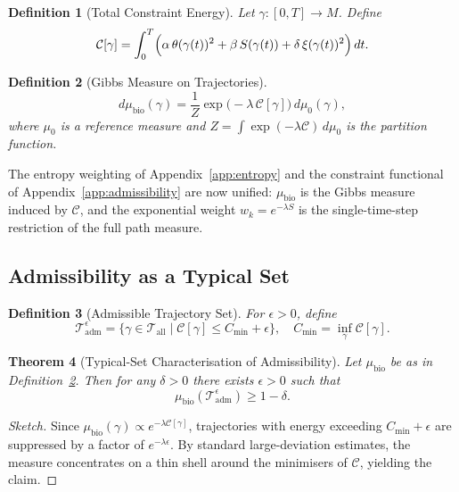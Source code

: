 \documentclass[12pt, a4paper]{article}
\newtheorem{theorem}{Theorem}[section]
\newtheorem{definition}[theorem]{Definition}
\theoremstyle{remark}
\theoremstyle{definition}
\begin{document}
\begin{definition}[Total Constraint Energy]
Let $\gamma\colon[0,T]\to M$.  Define
\[
\mathcal{C}[\gamma]
= \int_0^T \Bigl(
\alpha\,\theta(\gamma(t))^2
+ \beta\,S(\gamma(t))
+ \delta\,\xi(\gamma(t))^2
\Bigr)\,dt.
\]
\end{definition}

\begin{definition}[Gibbs Measure on Trajectories]
\label{def:gibbs}
\[
d\mu_{\mathrm{bio}}(\gamma)
= \frac{1}{Z}\exp\!\bigl(-\lambda\,\mathcal{C}[\gamma]\bigr)\,d\mu_0(\gamma),
\]
where $\mu_0$ is a reference measure and $Z = \int \exp(-\lambda\mathcal{C})\,d\mu_0$
is the partition function.
\end{definition}

The entropy weighting of Appendix~\ref{app:entropy} and the constraint functional of
Appendix~\ref{app:admissibility} are now unified: $\mu_{\mathrm{bio}}$ is the Gibbs
measure induced by $\mathcal{C}$, and the exponential weight $w_k = e^{-\lambda S}$ is
the single-time-step restriction of the full path measure.

\subsection{Admissibility as a Typical Set}

\begin{definition}[Admissible Trajectory Set]
For $\epsilon > 0$, define
\[
\mathcal{T}_{\mathrm{adm}}^\epsilon
= \bigl\{\gamma \in \mathcal{T}_{\mathrm{all}} \mid
\mathcal{C}[\gamma] \le C_{\min} + \epsilon\bigr\},
\quad C_{\min} = \inf_\gamma \mathcal{C}[\gamma].
\]
\end{definition}

\begin{theorem}[Typical-Set Characterisation of Admissibility]
\label{thm:typical}
Let $\mu_{\mathrm{bio}}$ be as in Definition~\ref{def:gibbs}.  Then for any $\delta > 0$
there exists $\epsilon > 0$ such that
\[
\mu_{\mathrm{bio}}(\mathcal{T}_{\mathrm{adm}}^\epsilon) \ge 1 - \delta.
\]
\end{theorem}

\begin{proof}[Sketch]
Since $\mu_{\mathrm{bio}}(\gamma) \propto e^{-\lambda\mathcal{C}[\gamma]}$, trajectories
with energy exceeding $C_{\min} + \epsilon$ are suppressed by a factor of $e^{-\lambda\epsilon}$.
By standard large-deviation estimates, the measure concentrates on a thin shell around the
minimisers of $\mathcal{C}$, yielding the claim.
\end{proof}
\end{document}
